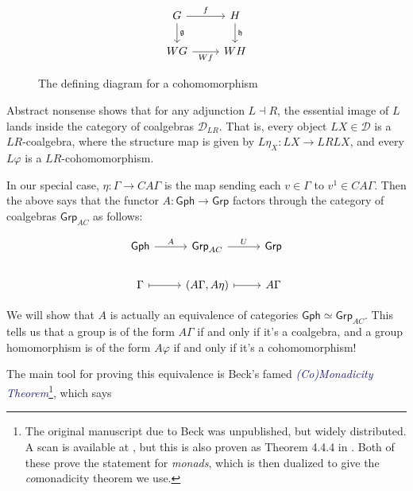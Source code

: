 \documentclass[12pt]{article}
\theoremstyle{definition}
\theoremstyle{theorem}
\newcommand*{\catFont}[1]{\mathsf{#1}}
\newcommand{\Grp}{\catFont{Grp}}
\newcommand*{\important}[1]{\textcolor{MidnightBlue}{\emph{#1}}}
\begin{document}
\begin{figure}
    \[
        \begin{tikzcd}
        G & H \\
        WG & WH
        \arrow["\mathfrak{g}", from=1-1, to=2-1]
        \arrow["\mathfrak{h}", from=1-2, to=2-2]
        \arrow["f", from=1-1, to=1-2]
        \arrow["Wf"', from=2-1, to=2-2]
        \end{tikzcd}
    \]    
    \caption{The defining diagram for a cohomomorphism}
    \label{fig:cohom}
\end{figure}

Abstract nonsense shows that for any adjunction $L \dashv R$, the 
essential image of $L$ lands inside the category of coalgebras $\mathcal{D}_{LR}$.
That is, every object $LX \in \mathcal{D}$ is a $LR$-coalgebra, 
where the structure map is given by $L \eta_X : LX \to LRLX$, and every 
$L \varphi$ is a $LR$-cohomomorphism.

In our special case, $\eta : \Gamma \to CA\Gamma$ is the map sending 
each $v \in \Gamma$ to $v^1 \in CA\Gamma$. Then the above says that the 
functor $A : \mathsf{Gph} \to \mathsf{Grp}$ factors through the 
category of coalgebras $\mathsf{Grp}_{AC}$ as follows:

\[\begin{tikzcd}
	{\mathsf{Gph}} & {\mathsf{Grp}_{AC}} & {\mathsf{Grp}} \\
	\Gamma & {(A\Gamma, A \eta)} & A\Gamma
	\arrow[maps to, from=2-1, to=2-2]
	\arrow[maps to, from=2-2, to=2-3]
	\arrow["A", from=1-1, to=1-2]
	\arrow["U", from=1-2, to=1-3]
\end{tikzcd}\]

We will show that $A$ is actually an equivalence of categories 
$\mathsf{Gph} \simeq \Grp_{AC}$. This tells us that a group is of the 
form $A\Gamma$ if and only if it's a coalgebra, and a group homomorphism is 
of the form $A\varphi$ if and only if it's a cohomomorphism!

The main tool for proving this equivalence is Beck's famed
\important{(Co)Monadicity Theorem}\footnote{The original manuscript due to Beck 
was unpublished, but widely distributed. A scan is available at
\cite{beckBeckMonadicityTheorem1968}, but this is also proven as
Theorem 4.4.4 in \cite{borceuxCategoriesStructures1994}. Both of 
these prove the statement for \emph{monads}, which is then dualized to give
the \emph{co}monadicity theorem we use.}, which says
\end{document}
